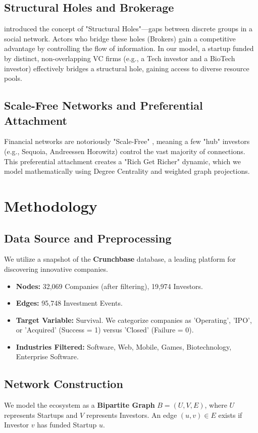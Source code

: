\documentclass[11pt, a4paper]{article}
\begin{document}
\subsection{Structural Holes and Brokerage}
\citet{burt1992} introduced the concept of "Structural Holes"---gaps between discrete groups in a social network. Actors who bridge these holes (Brokers) gain a competitive advantage by controlling the flow of information. In our model, a startup funded by distinct, non-overlapping VC firms (e.g., a Tech investor and a BioTech investor) effectively bridges a structural hole, gaining access to diverse resource pools.

\subsection{Scale-Free Networks and Preferential Attachment}
Financial networks are notoriously "Scale-Free" \citep{barabasi1999}, meaning a few "hub" investors (e.g., Sequoia, Andreessen Horowitz) control the vast majority of connections. This preferential attachment creates a "Rich Get Richer" dynamic, which we model mathematically using Degree Centrality and weighted graph projections.

\section{Methodology}

\subsection{Data Source and Preprocessing}
We utilize a snapshot of the \textbf{Crunchbase} database, a leading platform for discovering innovative companies.
\begin{itemize}
    \item \textbf{Nodes:} 32,069 Companies (after filtering), 19,974 Investors.
    \item \textbf{Edges:} 95,748 Investment Events.
    \item \textbf{Target Variable:} Survival. We categorize companies as 'Operating', 'IPO', or 'Acquired' (Success = 1) versus 'Closed' (Failure = 0).
    \item \textbf{Industries Filtered:} Software, Web, Mobile, Games, Biotechnology, Enterprise Software.
\end{itemize}

\subsection{Network Construction}
We model the ecosystem as a \textbf{Bipartite Graph} $B = (U, V, E)$, where $U$ represents Startups and $V$ represents Investors. An edge $(u, v) \in E$ exists if Investor $v$ has funded Startup $u$.
\end{document}
